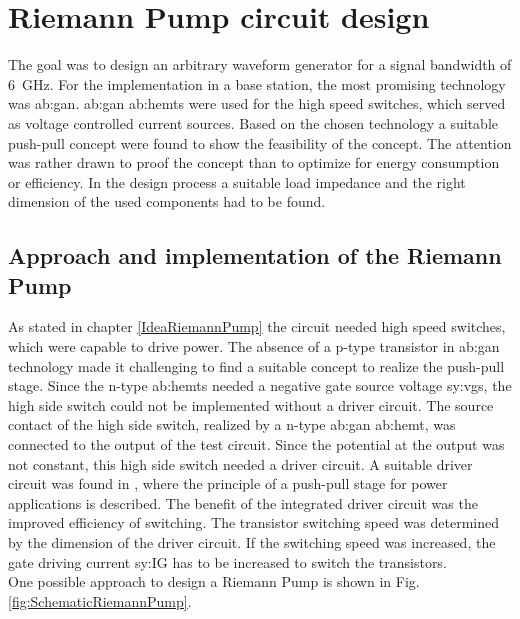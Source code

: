 \chapter{Riemann Pump circuit design}
\label{ch:design}
The goal was to design an arbitrary waveform generator for a signal bandwidth of \SI{6}{\giga \hertz}.
For the implementation in a base station, the most promising technology was \gls{ab:gan}.
\gls{ab:gan} \glspl{ab:hemt} were used for the high speed switches, which served as voltage controlled current sources.
Based on the chosen technology a suitable push-pull concept were found \cite{MaksimovicPaper} to show the feasibility of the concept.
The attention was rather drawn to proof the concept than to optimize for energy consumption or efficiency.
In the design process a suitable load impedance and the right dimension of the used components had to be found.

\section{Approach and implementation of the Riemann Pump}
As stated in chapter \ref{IdeaRiemannPump} the circuit needed high speed switches, which were capable to drive power.
The absence of a p-type transistor in \gls{ab:gan} technology made it challenging to find a suitable concept to realize the push-pull stage.
Since the n-type \glspl{ab:hemt} needed a negative gate source voltage \gls{sy:vgs}, the high side switch could not be implemented without a driver circuit.
The source contact of the high side switch, realized by a n-type \gls{ab:gan} \gls{ab:hemt}, was connected to the output of the test circuit.
Since the potential at the output was not constant, this high side switch needed a driver circuit.
A suitable driver circuit was found in \cite{MaksimovicPaper}, where the principle of a push-pull stage for power applications is described.
The benefit of the integrated driver circuit was the improved efficiency of switching.
The transistor switching speed was determined by the dimension of the driver circuit.
If the switching speed was increased, the gate driving current \gls{sy:IG} has to be increased to switch the transistors.\\
One possible approach to design a Riemann Pump is shown in Fig. \ref{fig:SchematicRiemannPump}.

